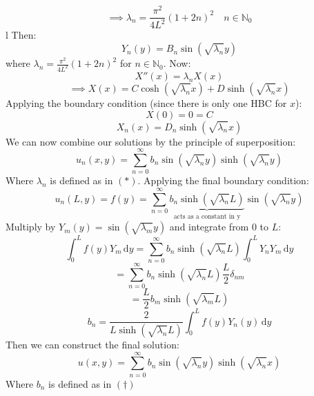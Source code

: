 \documentclass[12pt]{article}
\begin{document}
\begin{equation*}
    \implies \lambda_n=\frac{\pi^2}{4L^2}(1+2n)^2\quad n\in\mathbb{N}_0 \tag{\(*\)}   
\end{equation*}l
Then:
\[Y_n(y)=B_n\sin(\sqrt{\lambda_n}y)\]
where \(\lambda_n=\frac{\pi^2}{4L^2}(1+2n)^2\) for \(n\in\mathbb{N}_0\). Now:
\[X''(x)=\lambda_nX(x)\]
\[\implies X(x)=C\cosh(\sqrt{\lambda_n}x)+D\sinh(\sqrt{\lambda_n}x)\]
Applying the boundary condition (since there is only one HBC for \(x\)):
\[X(0)=0=C\]
\[X_n(x)=D_n\sinh(\sqrt{\lambda_n}x)\]
We can now combine our solutions by the principle of superposition:
\[u_n(x,y)=\sum^\infty_{n=0}b_n\sin(\sqrt{\lambda_n}y)\sinh(\sqrt{\lambda_n}y)\]
Where \(\lambda_n\) is defined as in \((*)\). Applying the final boundary condition:
\[u_n(L,y)=f(y)=\sum^\infty_{n=0}\underbrace{b_n\sinh(\sqrt{\lambda_n}L)}_{\text{acts as a constant in y}}\sin(\sqrt{\lambda_n}y)\]
Multiply by \(Y_m(y)=\sin(\sqrt{\lambda_m}y)\) and integrate from \(0\) to \(L\):
\[\int^L_0f(y)Y_m\, \text{d}y=\sum^\infty_{n=0}b_n\sinh(\sqrt{\lambda_n}L)\int^L_0Y_nY_m\,\text{d}y\]
\[=\sum^\infty_{n=0}b_n\sinh(\sqrt{\lambda_n}L)\frac{L}{2}\delta_{nm}\]
\[=\frac{L}{2}b_m\sinh(\sqrt{\lambda_m}L)\]
\begin{equation*}
    b_n=\frac{2}{L\sinh(\sqrt{\lambda_n}L)}\int^L_0f(y)Y_n(y)\,\text{d}y\tag{\(\dagger\)}
\end{equation*}
Then we can construct the final solution:
\[u(x,y)=\sum^\infty_{n=0}b_n\sin(\sqrt{\lambda_n}y)\sinh(\sqrt{\lambda_n}x)\]
Where \(b_n\) is defined as in \((\dagger)\)
\end{document}
